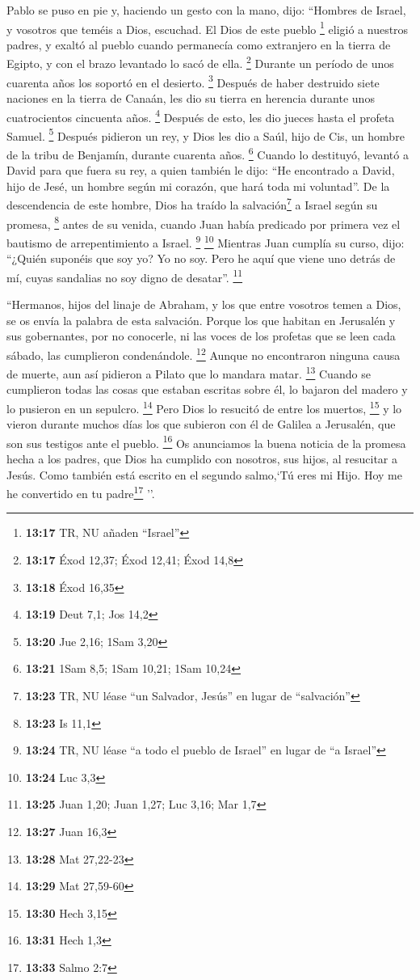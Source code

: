 \begin{paracol}{2}
 Pablo se puso en pie y, haciendo un gesto con la mano,
dijo: ``Hombres de Israel, y vosotros que teméis a Dios, escuchad.
 El Dios de este pueblo \footnote{\textbf{13:17} TR, NU
  añaden ``Israel''} eligió a nuestros padres, y exaltó al pueblo cuando
permanecía como extranjero en la tierra de Egipto, y con el brazo
levantado lo sacó de ella. \footnote{\textbf{13:17} Éxod 12,37; Éxod
  12,41; Éxod 14,8}  Durante un período de unos cuarenta
años los soportó en el desierto. \footnote{\textbf{13:18} Éxod 16,35}
 Después de haber destruido siete naciones en la tierra
de Canaán, les dio su tierra en herencia durante unos cuatrocientos
cincuenta años. \footnote{\textbf{13:19} Deut 7,1; Jos 14,2}
 Después de esto, les dio jueces hasta el profeta Samuel.
\footnote{\textbf{13:20} Jue 2,16; 1Sam 3,20}  Después
pidieron un rey, y Dios les dio a Saúl, hijo de Cis, un hombre de la
tribu de Benjamín, durante cuarenta años. \footnote{\textbf{13:21} 1Sam
  8,5; 1Sam 10,21; 1Sam 10,24}  Cuando lo destituyó,
levantó a David para que fuera su rey, a quien también le dijo: ``He
encontrado a David, hijo de Jesé, un hombre según mi corazón, que hará
toda mi voluntad''.  De la descendencia de este hombre,
Dios ha traído la salvación\footnote{\textbf{13:23} TR, NU léase ``un
  Salvador, Jesús'' en lugar de ``salvación''} a Israel según su
promesa, \footnote{\textbf{13:23} Is 11,1}  antes de su
venida, cuando Juan había predicado por primera vez el bautismo de
arrepentimiento a Israel. \footnote{\textbf{13:24} TR, NU léase ``a todo
  el pueblo de Israel'' en lugar de ``a Israel''} \footnote{\textbf{13:24}
  Luc 3,3}  Mientras Juan cumplía su curso, dijo:
``¿Quién suponéis que soy yo? Yo no soy. Pero he aquí que viene uno
detrás de mí, cuyas sandalias no soy digno de desatar''. \footnote{\textbf{13:25}
  Juan 1,20; Juan 1,27; Luc 3,16; Mar 1,7}

 ``Hermanos, hijos del linaje de Abraham, y los que entre
vosotros temen a Dios, se os envía la palabra de esta salvación.
 Porque los que habitan en Jerusalén y sus gobernantes,
por no conocerle, ni las voces de los profetas que se leen cada sábado,
las cumplieron condenándole. \footnote{\textbf{13:27} Juan 16,3}
 Aunque no encontraron ninguna causa de muerte, aun así
pidieron a Pilato que lo mandara matar. \footnote{\textbf{13:28} Mat
  27,22-23}  Cuando se cumplieron todas las cosas que
estaban escritas sobre él, lo bajaron del madero y lo pusieron en un
sepulcro. \footnote{\textbf{13:29} Mat 27,59-60}  Pero
Dios lo resucitó de entre los muertos, \footnote{\textbf{13:30} Hech
  3,15}  y lo vieron durante muchos días los que subieron
con él de Galilea a Jerusalén, que son sus testigos ante el pueblo.
\footnote{\textbf{13:31} Hech 1,3}  Os anunciamos la
buena noticia de la promesa hecha a los padres,  que Dios
ha cumplido con nosotros, sus hijos, al resucitar a Jesús. Como también
está escrito en el segundo salmo,`Tú eres mi Hijo. Hoy me he convertido
en tu padre\footnote{\textbf{13:33} Salmo 2:7} ''.


\end{paracol}
